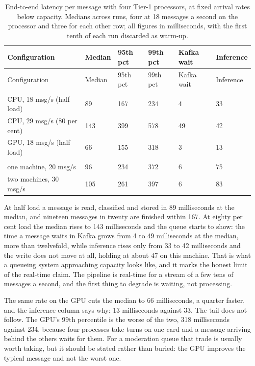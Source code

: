 \begin{longtable}{@{}llllll@{}}
\caption{End-to-end latency per message with four Tier-1 processors, at fixed arrival rates below capacity. Medians across runs, four at 18 messages a second on the processor and three for each other row; all figures in milliseconds, with the first tenth of each run discarded as warm-up.}\label{tab:pipeline-latency}\tabularnewline
\toprule
Configuration & Median & 95th pct & 99th pct & Kafka wait & Inference \\
\midrule
\endfirsthead
\toprule
Configuration & Median & 95th pct & 99th pct & Kafka wait & Inference \\
\midrule
\endhead
\bottomrule
\endlastfoot
\multicolumn{6}{@{}l}{\emph{laptop, four processors}} \\
CPU, 18 msg/s (half load) & 89 & 167 & 234 & 4 & 33 \\
CPU, 29 msg/s (80 per cent) & 143 & 399 & 578 & 49 & 42 \\
GPU, 18 msg/s (half load) & 66 & 155 & 318 & 3 & 13 \\
\addlinespace[0.4em]
\multicolumn{6}{@{}l}{\emph{cluster, four processors per machine}} \\
one machine, 20 msg/s & 96 & 234 & 372 & 6 & 75 \\
two machines, 30 msg/s & 105 & 261 & 397 & 6 & 83 \\
\end{longtable}

At half load a message is read, classified and stored in 89 milliseconds at the median, and nineteen messages in twenty are finished within 167. At eighty per cent load the median rises to 143 milliseconds and the queue starts to show: the time a message waits in Kafka grows from 4 to 49 milliseconds at the median, more than twelvefold, while inference rises only from 33 to 42 milliseconds and the write does not move at all, holding at about 47 on this machine. That is what a queueing system approaching capacity looks like, and it marks the honest limit of the real-time claim. The pipeline is real-time for a stream of a few tens of messages a second, and the first thing to degrade is waiting, not processing.

The same rate on the GPU cuts the median to 66 milliseconds, a quarter faster, and the inference column says why: 13 milliseconds against 33. The tail does not follow. The GPU's 99th percentile is the worse of the two, 318 milliseconds against 234, because four processes take turns on one card and a message arriving behind the others waits for them. For a moderation queue that trade is usually worth taking, but it should be stated rather than buried: the GPU improves the typical message and not the worst one.

